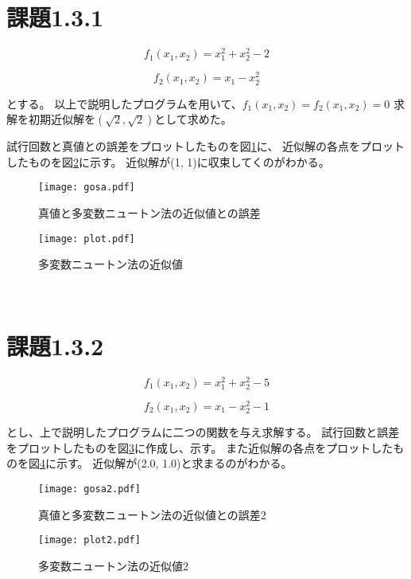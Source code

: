 \documentclass[uplatex, 11pt,a4j, titlepage]{jsarticle}
\begin{document}
\section{課題1.3.1}

\begin{equation}
    f_1(x_1, x_2) = x_1^2 + x_2^2 - 2
\end{equation}

\begin{equation}
    f_2(x_1, x_2) = x_1 - x_2^2
\end{equation}

とする。
以上で説明したプログラムを用いて、$f_1(x_1, x_2) = f_2(x_1, x_2) = 0$
求解を初期近似解を$(\sqrt{2},\sqrt{2})$として求めた。

試行回数と真値との誤差をプロットしたものを図\ref{gosa}に、
近似解の各点をプロットしたものを図\ref{plot}に示す。
近似解が(1, 1)に収束してくのがわかる。

\begin{figure}[h]
    \centering
    \texttt{[image: gosa.pdf]}
    \caption{真値と多変数ニュートン法の近似値との誤差}
    \label{gosa}
\end{figure}

\begin{figure}[h]
    \centering
    \texttt{[image: plot.pdf]}
    \caption{多変数ニュートン法の近似値}
    \label{plot}
\end{figure}

\newpage
\newpage
\ 
\newpage

\section{課題1.3.2}

\begin{equation}
    f_1(x_1, x_2) = x_1^2 + x_2^2 - 5
\end{equation}

\begin{equation}
    f_2(x_1, x_2) = x_1 - x_2 ^2 -1
\end{equation}

とし、上で説明したプログラムに二つの関数を与え求解する。
試行回数と誤差をプロットしたものを図\ref{gosa2}に作成し、示す。
また近似解の各点をプロットしたものを図\ref{plot2}に示す。
近似解が(2.0, 1.0)と求まるのがわかる。

\begin{figure}[h]
    \centering
    \texttt{[image: gosa2.pdf]}
    \caption{真値と多変数ニュートン法の近似値との誤差2}
    \label{gosa2}
\end{figure}

\begin{figure}[h]
    \centering
    \texttt{[image: plot2.pdf]}
    \caption{多変数ニュートン法の近似値2}
    \label{plot2}
\end{figure}

\newpage

\newpage
\thispagestyle{empty}
\nocite{key1}
\nocite{key2}


\end{document}
